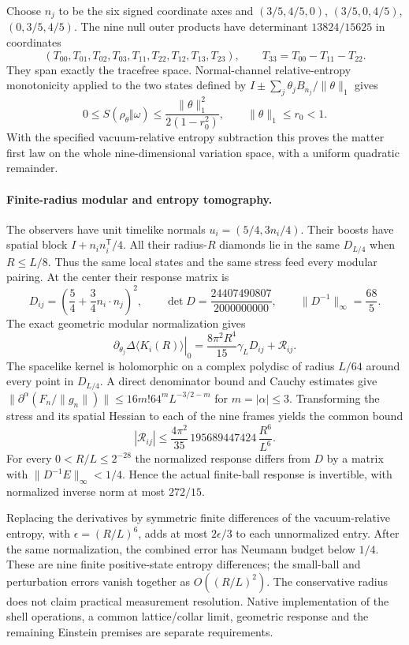 Choose $n_j$ to be the six signed coordinate axes and
$(3/5,4/5,0)$, $(3/5,0,4/5)$, $(0,3/5,4/5)$.
The nine null outer products have determinant $13824/15625$ in coordinates
\[
 (T_{00},T_{01},T_{02},T_{03},T_{11},T_{22},T_{12},T_{13},T_{23}),
 \qquad T_{33}=T_{00}-T_{11}-T_{22}.
\]
They span exactly the tracefree space.
Normal-channel relative-entropy monotonicity applied to the two states
defined by $I\pm\sum_j\theta_jB_{n_j}/\|\theta\|_1$ gives
\[
 0\leq S(\rho_\theta\Vert\omega)
 \leq\frac{\|\theta\|_1^2}{2(1-r_0^2)},
 \qquad \|\theta\|_1\leq r_0<1.
\]
With the specified vacuum-relative entropy subtraction this
proves the matter first law on the whole nine-dimensional variation
space, with a uniform quadratic remainder.

\paragraph{Finite-radius modular and entropy tomography.}
The observers have unit timelike normals $u_i=(5/4,3n_i/4)$.
Their boosts have spatial block $I+n_in_i^{\mathsf T}/4$.
All their radius-$R$ diamonds lie in the
same $D_{L/4}$ when $R\leq L/8$. Thus the same local states and the same
stress feed every modular pairing. At the center their response matrix is
\[
 D_{ij}=\left(\frac54+\frac34 n_i\cdot n_j\right)^2,
 \qquad \det D=\frac{24407490807}{2000000000},\qquad
 \|D^{-1}\|_\infty=\frac{68}{5}.
\]
The exact geometric modular normalization gives
\[
 \left.\partial_{\theta_j}\Delta\langle K_i(R)\rangle\right|_0
 =\frac{8\pi^2R^4}{15}\gamma_LD_{ij}+\mathcal R_{ij}.
\]
The spacelike kernel is holomorphic on a complex polydisc of radius
$L/64$ around every point in $D_{L/4}$. A direct denominator bound and
Cauchy estimates give
$\|\partial^\alpha(F_n/\|g_n\|)\|\leq
16m!64^mL^{-3/2-m}$ for $m=|\alpha|\leq3$.
Transforming the stress and its spatial Hessian to each of the nine
frames yields the common bound
\[
 |\mathcal R_{ij}|\leq
 \frac{4\pi^2}{35}\,195689447424\,\frac{R^6}{L^6}.
\]
For every $0<R/L\leq2^{-28}$ the normalized response differs from $D$
by a matrix with $\|D^{-1}E\|_\infty<1/4$.
Hence the actual finite-ball response is invertible, with normalized
inverse norm at most $272/15$.

Replacing the derivatives by symmetric finite differences of the
vacuum-relative entropy, with $\epsilon=(R/L)^6$, adds at most
$2\epsilon/3$ to each unnormalized entry. After the same normalization,
the combined error has Neumann budget below $1/4$. These are nine
finite positive-state entropy differences; the small-ball and perturbation
errors vanish together as $O((R/L)^2)$. The conservative radius does not
claim practical measurement resolution. Native implementation of the
shell operations, a common lattice/collar limit, geometric response and
the remaining Einstein premises are separate requirements.
